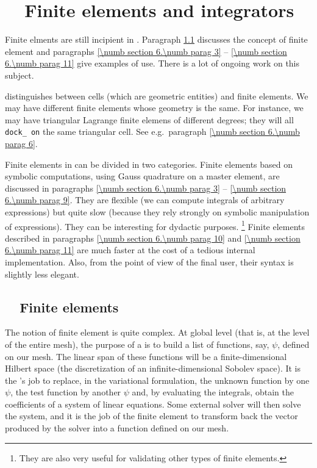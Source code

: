 
\chapter{~~Finite elements and integrators}\label{\numb section 6}


Finite elments are still incipient in \maniFEM.
Paragraph \ref{\numb section 6.\numb parag 1} discusses the concept of finite element
and paragraphs \ref{\numb section 6.\numb parag 3} -- \ref{\numb section 6.\numb parag 11}
give examples of use.
There is a lot of ongoing work on this subject.

{\ManiFEM} distinguishes between cells (which are geometric entities) and finite elements.
We may have different finite elements whose geometry is the same.
For instance, we may have triangular Lagrange finite elemens of different degrees;
they will all {\small\tt dock\_\,on} the same triangular cell.
See e.g.\ paragraph \ref{\numb section 6.\numb parag 6}.

Finite elements in {\maniFEM} can be divided in two categories.
Finite elements based on symbolic computations, using Gauss quadrature on a master element,
are discussed in
paragraphs \ref{\numb section 6.\numb parag 3} -- \ref{\numb section 6.\numb parag 9}.
They are flexible (we can compute integrals of arbitrary expressions) but quite slow
(because they rely strongly on symbolic manipulation of expressions).
They can be interesting for dydactic purposes.%
\footnote {{} They are also very useful for validating other types of finite elements.}
Finite elements described in paragraphs \ref{\numb section 6.\numb parag 10} and
\ref{\numb section 6.\numb parag 11} are much faster at the cost of a tedious internal
implementation.
Also, from the point of view of the final user, their syntax is slightly less elegant.


\section{~~Finite elements}\label{\numb section 6.\numb parag 1}

The notion of finite element is quite complex.
At global level (that is, at the level of the entire mesh),
the purpose of a {\small\tt{}} is to build a list of functions, say, $ \psi $,
defined on our mesh.
The linear span of these functions will be a finite-dimensional Hilbert space
(the discretization of an infinite-dimensional Sobolev space).
It is the {\small\tt{}}'s job to replace, in the variational formulation,
the unknown function by one $ \psi $, the test function by another $ \psi $ and,
by evaluating the integrals, obtain the coefficients of a system of linear equations.
Some external solver will then solve the system, and it is the job of the finite element
to transform back the vector produced by the solver into a function defined on our mesh.

